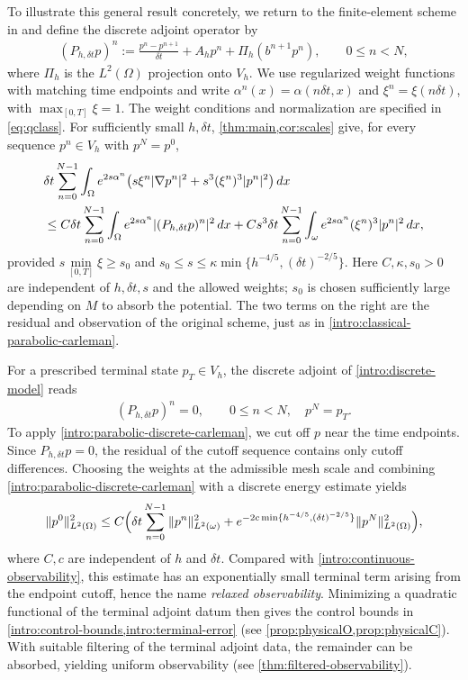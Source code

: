 \documentclass[print,wide,eng]{draft}
\begin{document}
To illustrate this general result concretely, we return to the finite-element scheme in  and define the discrete adjoint operator by
%
\begin{align*}
(P_{h,\delta t}p)^n
:=\frac{p^n-p^{n+1}}{\delta t}+A_hp^n+\Pi_h(b^{n+1}p^n),
\qquad 0\leq n<N,
\end{align*}
%
where $\Pi_h$ is the $L^2(\Omega)$ projection onto $V_h$.
We use regularized weight functions with matching time endpoints and write $\alpha^n(x)=\alpha(n\delta t,x)$ and $\xi^n=\xi(n\delta t)$, with $\max_{[0,T]}\xi=1$. The weight conditions and normalization are specified in \cref{eq:qclass}.
For sufficiently small $h,\delta t$, \cref{thm:main,cor:scales} give, for every sequence $p^n\in V_h$ with $p^N=p^0$,
%
\begin{align}\label{intro:parabolic-discrete-carleman}
&\delta t\sum_{n=0}^{N-1}\int_\Omega e^{2s\alpha^n}
\bigl(s\xi^n|\nabla p^n|^2+s^3(\xi^n)^3|p^n|^2\bigr)\,dx
\notag
\\
&
\leq C\delta t\sum_{n=0}^{N-1}\int_\Omega e^{2s\alpha^n}
|(P_{h,\delta t}p)^n|^2\,dx
+Cs^3\delta t\sum_{n=0}^{N-1}\int_\omega e^{2s\alpha^n}(\xi^n)^3|p^n|^2\,dx,
\end{align}
%
provided $s\min\limits_{[0,T]}\xi\geq s_0$ and
$
s_0\leq s\leq\kappa\min\{h^{-4/5},(\delta t)^{-2/5}\}$.
Here $C,\kappa,s_0>0$ are independent of $h,\delta t,s$ and the allowed weights; $s_0$ is chosen sufficiently large depending on $M$ to absorb the potential. The two terms on the right are the residual and observation of the original scheme, just as in \cref{intro:classical-parabolic-carleman}.

For a prescribed terminal state $p_T\in V_h$, the discrete adjoint of \cref{intro:discrete-model} reads
%
\begin{align}\label{intro:discrete-adjoint}
(P_{h,\delta t}p)^n=0,\qquad 0\leq n<N,
\quad p^N=p_T.
\end{align}
%
To apply \cref{intro:parabolic-discrete-carleman}, we cut off $p$ near the time endpoints. Since $P_{h,\delta t}p=0$, the residual of the cutoff sequence contains only cutoff differences. Choosing the weights at the admissible mesh scale and combining \cref{intro:parabolic-discrete-carleman} with a discrete energy estimate yields
%
\begin{align}\label{intro:observability}
\|p^0\|_{L^2(\Omega)}^2
\leq C\Bigl(
{\delta t}\sum_{n=0}^{N-1}\|p^n\|_{L^2(\omega)}^2
+e^{-2c\min\{h^{-4/5},{(\delta t)}^{-2/5}\}}\|p^N\|_{L^2(\Omega)}^2
\Bigr),
\end{align}
%
where $C,c$ are independent of $h$ and ${\delta t}$. Compared with \cref{intro:continuous-observability}, this estimate has an exponentially small terminal term arising from the endpoint cutoff, hence the name \emph{relaxed observability}.
Minimizing a quadratic functional of the terminal adjoint datum then gives the control bounds in \cref{intro:control-bounds,intro:terminal-error} (see \cref{prop:physicalO,prop:physicalC}).
With suitable filtering of the terminal adjoint data, the remainder can be absorbed, yielding uniform observability  (see \cref{thm:filtered-observability}).
\end{document}
